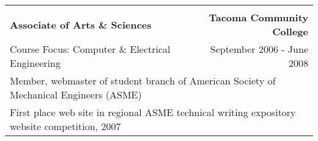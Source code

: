 \documentclass[letterpaper]{article}
\begin{document}
\begin{center}
\begin{tabular}{p{}r}
			\\
			\\
				\textbf{Associate of Arts \& Sciences}		    	&
				\textbf{Tacoma Community College \quad}
			\\
				{\quad Course Focus: Computer \& Electrical Engineering}	&
				{September 2006 - June 2008 \quad\quad}
			\\
				\multicolumn{2}{p{\textwidth}}{\quad Member, webmaster of student branch of American Society of Mechanical Engineers (ASME)}	
			\\
				\multicolumn{2}{p{\textwidth}}{\quad First place web site in regional ASME technical writing expository website competition, 2007}
			\\
		\end{tabular} \\
	\end{center} 
\end{document}
